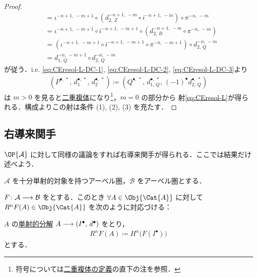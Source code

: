 \documentclass[algtopo_main]{subfiles}
\begin{document}
\begin{proof}
\begin{align}
        &= \iota^{-n+1,\, -m+1} \circ (d^{-n+1,\, -m}_{2,\, Z} \circ i^{-n+1,\, -m}) \circ \pi^{-n,\, -m} \\
        &= \iota^{-n+1,\, -m+1} \circ i^{-n+1,\, -m+1} \circ (d^{-n+1,\, -m}_{2,\, B} \circ \pi^{-n,\, -m}) \\
        &= (\iota^{-n+1,\, -m+1} \circ i^{-n+1,\, -m+1} \circ \pi^{-n,\, -m+1}) \circ d^{-n,\, -m}_{2,\, Q} \\
        &= d^{-n,\, -m+1}_{1,\, Q} \circ d^{-n,\, -m}_{2,\, Q} \label{eq:CEresol-L-DC-3}
    \end{align}
    が従う．i.e. \eqref{eq:CEresol-L-DC-1}, \eqref{eq:CEresol-L-DC-2}, \eqref{eq:CEresol-L-DC-3}より
    \begin{align}
        (P^{\bullet,\, *},\, d_1^{\bullet,\, *},\, d_2^{\bullet,\, *}) \coloneqq (Q^{\bullet,\, *},\, d_{1,\, Q}^{\bullet,\, *},\, (-1)^\bullet d_{2,\, Q}^{\bullet,\, *})
    \end{align}
    は $m > 0$ を見ると\hyperref[def:double-complex]{二重複体}になり\footnote{符号については\hyperref[def:double-complex]{二重複体の定義}の直下の注を参照．}，$m=0$ の部分から
    射\eqref{eq:CEresol-L}が得られる．構成よりこの射は条件 (1), (2), (3) を充たす．
\end{proof}

\subsection{右導来関手}

$\OP{\mathcal{A}}$ に対して同様の議論をすれば右導来関手が得られる．ここでは結果だけ述べよう．

$\mathcal{A}$ を十分単射的対象を持つアーベル圏，$\mathcal{B}$ をアーベル圏とする．

\begin{mydef}[label=def:RDF]{}
    $F \colon \mathcal{A} \longrightarrow \mathcal{B}$ をとする．このとき $\forall A \in \Obj{\Cat{A}}$ に対して $R^n F(A) \in \Obj{\Cat{A}}$ を次のように対応づける：

    $A$ の\hyperref[def:injective-resolution]{単射的分解} $A \longrightarrow (I^\bullet,\, d^\bullet)$ をとり，
    \begin{align}
        R^n F(A) \coloneqq H^n \bigl( F(I^\bullet) \bigr) 
    \end{align}
    とする．
\end{mydef}
\end{document}
